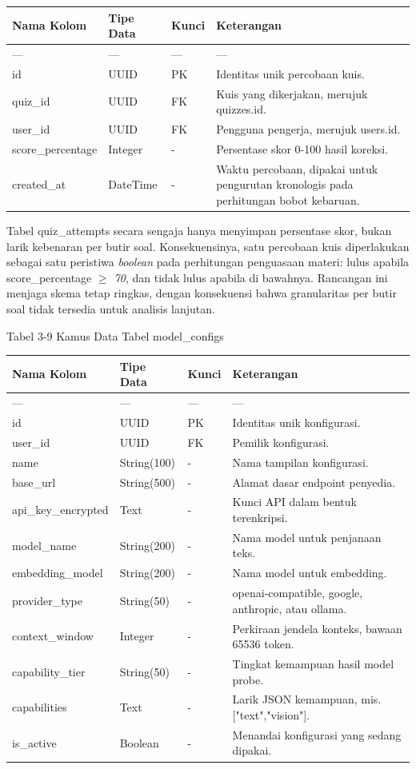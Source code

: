 \documentclass[12pt,a4paper]{article}
\begin{document}
\begin{table}[h]
\centering
\begin{tabular}{llll}
\toprule
Nama Kolom & Tipe Data & Kunci & Keterangan \\
\midrule
--- & --- & --- & --- \\
id & UUID & PK & Identitas unik percobaan kuis. \\
quiz\_id & UUID & FK & Kuis yang dikerjakan, merujuk quizzes.id. \\
user\_id & UUID & FK & Pengguna pengerja, merujuk users.id. \\
score\_percentage & Integer & - & Persentase skor 0-100 hasil koreksi. \\
created\_at & DateTime & - & Waktu percobaan, dipakai untuk pengurutan kronologis pada perhitungan bobot kebaruan. \\
\bottomrule
\end{tabular}
\end{table}
Tabel quiz\_attempts secara sengaja hanya menyimpan persentase skor, bukan larik kebenaran per butir soal. Konsekuensinya, satu percobaan kuis diperlakukan sebagai satu peristiwa \textit{boolean} pada perhitungan penguasaan materi: lulus apabila score\_percentage \textit{$\ge$ 70}, dan tidak lulus apabila di bawahnya. Rancangan ini menjaga skema tetap ringkas, dengan konsekuensi bahwa granularitas per butir soal tidak tersedia untuk analisis lanjutan.

Tabel 3-9	Kamus Data Tabel model\_configs

\begin{table}[h]
\centering
\begin{tabular}{llll}
\toprule
Nama Kolom & Tipe Data & Kunci & Keterangan \\
\midrule
--- & --- & --- & --- \\
id & UUID & PK & Identitas unik konfigurasi. \\
user\_id & UUID & FK & Pemilik konfigurasi. \\
name & String(100) & - & Nama tampilan konfigurasi. \\
base\_url & String(500) & - & Alamat dasar endpoint penyedia. \\
api\_key\_encrypted & Text & - & Kunci API dalam bentuk terenkripsi. \\
model\_name & String(200) & - & Nama model untuk penjanaan teks. \\
embedding\_model & String(200) & - & Nama model untuk embedding. \\
provider\_type & String(50) & - & openai-compatible, google, anthropic, atau ollama. \\
context\_window & Integer & - & Perkiraan jendela konteks, bawaan 65536 token. \\
capability\_tier & String(50) & - & Tingkat kemampuan hasil model probe. \\
capabilities & Text & - & Larik JSON kemampuan, mis. {[}"text","vision"{]}. \\
is\_active & Boolean & - & Menandai konfigurasi yang sedang dipakai. \\
\bottomrule
\end{tabular}
\end{table}
\end{document}
